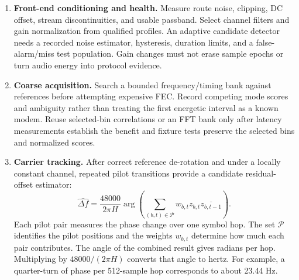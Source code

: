 \begin{enumerate}[leftmargin=1.6em]
  \item \textbf{Front-end conditioning and health.} Measure route noise,
        clipping, DC offset, stream discontinuities, and usable passband.
        Select channel filters and gain normalization from qualified profiles.
        An adaptive candidate detector needs a recorded noise estimator,
        hysteresis, duration limits, and a false-alarm/miss test population.
        Gain changes must not erase sample epochs or turn audio energy into
        protocol evidence.
  \item \textbf{Coarse acquisition.} Search a bounded frequency/timing bank
        against references before attempting expensive FEC. Record competing
        mode scores and ambiguity rather than treating the first energetic
        interval as a known modem. Reuse selected-bin correlations or an FFT
        bank only after latency measurements establish the benefit and fixture
        tests preserve the selected bins and normalized scores.
  \item \textbf{Carrier tracking.} After correct reference de-rotation and
        under a locally constant channel, repeated pilot transitions provide
        a candidate residual-offset estimator:
        \[
          \widehat{\Delta f}=\frac{48000}{2\pi H}
          \arg\!\left(\sum_{(b,t)\in\mathcal P}
          w_{b,t}z_{b,t}\overline{z_{b,t-1}}\right).
        \]
        Each pilot pair measures the phase change over one symbol hop.
        The set $\mathcal P$ identifies the pilot positions and the
        weights $w_{b,t}$ determine how much each pair contributes.
        The angle of the combined result gives radians per hop.
        Multiplying by $48000/(2\pi H)$ converts that angle to hertz.
        For example, a quarter-turn of phase per 512-sample hop
        corresponds to about 23.44 Hz.


\end{enumerate}

